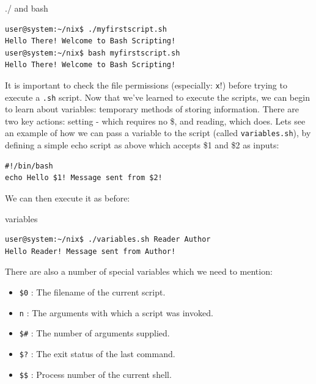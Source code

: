 \documentclass[11pt]{article}
\begin{document}
\begin{listing}[H]
\caption{./ and bash}\vspace{-0.1in}
\begin{verbatim}
user@system:~/nix$ ./myfirstscript.sh
Hello There! Welcome to Bash Scripting!
user@system:~/nix$ bash myfirstscript.sh
Hello There! Welcome to Bash Scripting!
\end{verbatim}
\end{listing}

It is important to check the file permissions (especially: \texttt{x}!) before trying to execute a \texttt{.sh} script. Now that we've learned to execute the scripts, we can begin to learn about variables: temporary methods of storing information. There are two key actions: setting - which requires no \$, and reading, which does. Lets see an example of how we can pass a variable to the script (called \texttt{variables.sh}), by defining a simple echo script as above which accepts \$1 and \$2 as inputs:\\

\begin{listing}[H]
\begin{verbatim}
#!/bin/bash
echo Hello $1! Message sent from $2!
\end{verbatim}
\end{listing}

We can then execute it as before:\\

\begin{listing}[H]
\caption{variables}\vspace{-0.1in}
\begin{verbatim}
user@system:~/nix$ ./variables.sh Reader Author
Hello Reader! Message sent from Author!
\end{verbatim}
\end{listing}

There are also a number of special variables which we need to mention:
\begin{itemize}
\item \texttt{\$0} : The filename of the current script.
\item \texttt{n} :  The arguments with which a script was invoked.
\item \texttt{\$\#} : The number of arguments supplied.
\item \texttt{\$?} : The exit status of the last command.
\item \texttt{\$\$} : Process number of the current shell.
\end{itemize}
\end{document}
